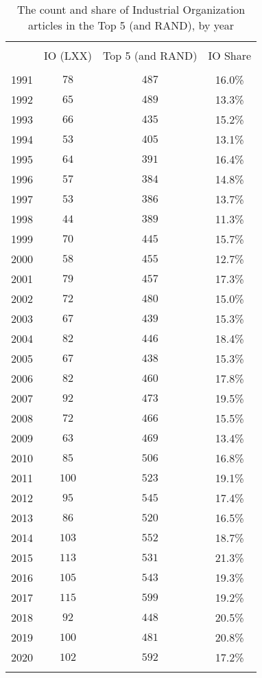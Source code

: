
\begin{table}[!htbp] \centering 
  \caption{The count and share of Industrial Organization articles in the Top 5 (and RAND), by year} 
  \label{} 
\footnotesize 
\begin{tabular}{@{\extracolsep{5pt}} cccc} 
\\[-1.8ex]\hline 
\hline \\[-1.8ex] 
 & IO (LXX) & Top 5 (and RAND) & IO Share \\ 
\hline \\[-1.8ex] 
1991 & $78$ & $487$ & 16.0\% \\ 
1992 & $65$ & $489$ & 13.3\% \\ 
1993 & $66$ & $435$ & 15.2\% \\ 
1994 & $53$ & $405$ & 13.1\% \\ 
1995 & $64$ & $391$ & 16.4\% \\ 
1996 & $57$ & $384$ & 14.8\% \\ 
1997 & $53$ & $386$ & 13.7\% \\ 
1998 & $44$ & $389$ & 11.3\% \\ 
1999 & $70$ & $445$ & 15.7\% \\ 
2000 & $58$ & $455$ & 12.7\% \\ 
2001 & $79$ & $457$ & 17.3\% \\ 
2002 & $72$ & $480$ & 15.0\% \\ 
2003 & $67$ & $439$ & 15.3\% \\ 
2004 & $82$ & $446$ & 18.4\% \\ 
2005 & $67$ & $438$ & 15.3\% \\ 
2006 & $82$ & $460$ & 17.8\% \\ 
2007 & $92$ & $473$ & 19.5\% \\ 
2008 & $72$ & $466$ & 15.5\% \\ 
2009 & $63$ & $469$ & 13.4\% \\ 
2010 & $85$ & $506$ & 16.8\% \\ 
2011 & $100$ & $523$ & 19.1\% \\ 
2012 & $95$ & $545$ & 17.4\% \\ 
2013 & $86$ & $520$ & 16.5\% \\ 
2014 & $103$ & $552$ & 18.7\% \\ 
2015 & $113$ & $531$ & 21.3\% \\ 
2016 & $105$ & $543$ & 19.3\% \\ 
2017 & $115$ & $599$ & 19.2\% \\ 
2018 & $92$ & $448$ & 20.5\% \\ 
2019 & $100$ & $481$ & 20.8\% \\ 
2020 & $102$ & $592$ & 17.2\% \\ 
\hline \\[-1.8ex] 
\end{tabular} 
\end{table} 
